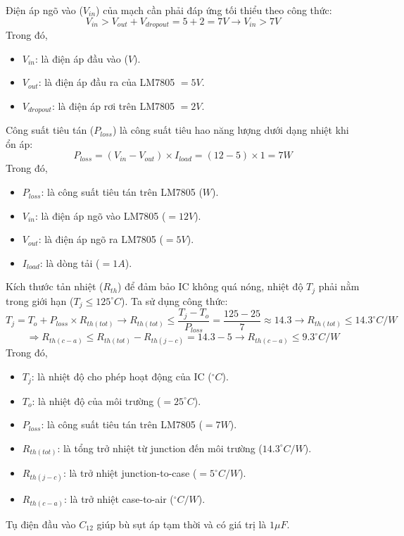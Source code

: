 Điện áp ngõ vào ($V_{in}$) của mạch cần phải đáp ứng tối thiểu theo công thức: \[ V_{in} > V_{out} + V_{dropout} = 5 + 2 = 7V \rightarrow V_{in} > 7V\]
Trong đó,
\begin{itemize}[label = -]
	\item $V_{in}$: là điện áp đầu vào ($V$).
	\item $V_{out}$: là điện áp đầu ra của LM7805 $=5V$.
	\item $V_{dropout}$: là điện áp rơi trên LM7805 $=2V$.
\end{itemize}

Công suất tiêu tán ($P_{loss}$) là công suất tiêu hao năng lượng dưới dạng nhiệt khi ổn áp: \[ P_{loss} = (V_{in} - V_{out}) \times I_{load} = (12 - 5)\times 1 = 7W\]
Trong đó,
\begin{itemize}[label=-]
	\item $P_{loss}$: là công suất tiêu tán trên LM7805 ($W$).
	\item $V_{in}$: là điện áp ngõ vào LM7805 ($=12V$).
	\item $V_{out}$: là điện áp ngõ ra LM7805 ($=5V$).
	\item $I_{load}$: là dòng tải ($=1A$).
\end{itemize}

Kích thước tản nhiệt ($R_{th}$) để đảm bảo IC không quá nóng, nhiệt độ $T_j$ phải nằm trong giới hạn ($T_j \leq 125^{\circ}C$). Ta sử dụng công thức: \[ T_{j} = T_{o} + P_{loss} \times R_{th(tot)} \rightarrow R_{th(tot)} \leq \dfrac{T_{j} - T_{o}}{P_{loss}} = \dfrac{125 - 25}{7} \approx 14.3 \rightarrow R_{th(tot)} \leq 14.3^{\circ}C/W
\]
\[ \Rightarrow R_{th(c-a)} \leq R_{th(tot)} - R_{th(j-c)} = 14.3 - 5 \rightarrow R_{th(c-a)} \leq 9.3^{\circ}C/W \]
Trong đó,
\begin{itemize}[label = -]
	\item $T_{j}$: là nhiệt độ cho phép hoạt động của IC ($ ^\circ C$).
	\item $T_{o}$: là nhiệt độ của môi trường ($=25^{\circ}C$).
	\item $P_{loss}$: là công suất tiêu tán trên LM7805 ($=7W$).
	\item $R_{th(tot)}$: là tổng trở nhiệt từ junction đến môi trường ($14.3^{\circ}C/W$).
	\item $R_{th(j-c)}$: là trở nhiệt junction-to-case ($=5^{\circ}C/W$).
	\item $R_{th(c-a)}$: là trở nhiệt case-to-air ($^{\circ}C/W$).
\end{itemize}

Tụ điện đầu vào $C_{12}$ giúp bù sụt áp tạm thời và có giá trị là $1\mu F$.

